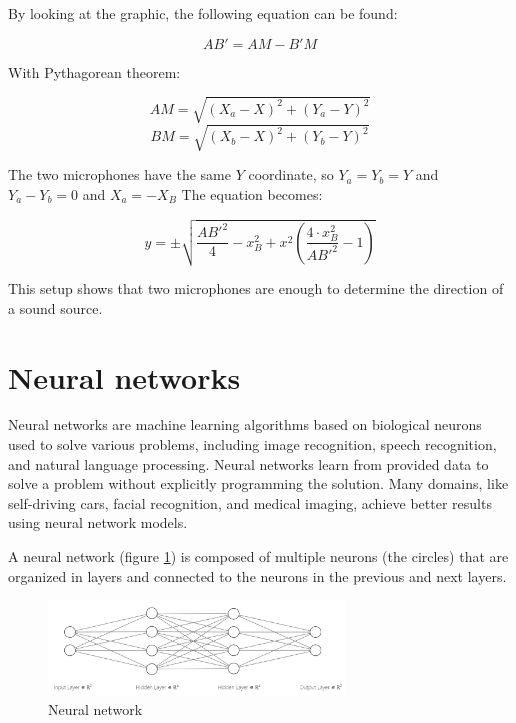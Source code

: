 By looking at the graphic, the following equation can be found:

\begin{equation}
    AB' = AM-B'M
\end{equation}

With Pythagorean theorem: 

\begin{equation}
    AM = \sqrt{(X_{a}-X)^2 + (Y_{a}-Y)^2}
\end{equation}
\begin{equation}
    BM = \sqrt{(X_{b}-X)^2 + (Y_{b}-Y)^2}
\end{equation}

The two microphones have the same $Y$ coordinate, so $Y_{a} = Y_{b} = Y$ and $Y_{a}-Y_{b} = 0$ and $X_{a} = -X_{B}$ The equation becomes:

\begin{equation}
    y = \pm\sqrt{\frac{AB'^2}{4} - x^2_{B} + x^2(\frac{4\cdot x^2_{B}}{AB'^2} - 1)}
\end{equation}

This setup shows that two microphones are enough to determine the direction of a sound source.

\section{Neural networks}

Neural networks are machine learning algorithms based on biological neurons used to solve various problems, including image recognition, speech recognition, and natural language processing. Neural networks learn from provided data to solve a problem without explicitly programming the solution. Many domains, like self-driving cars, facial recognition, and medical imaging, achieve better results using neural network models. 

A neural network (figure \ref*{fig:neural_network}) is composed of multiple neurons (the circles) that are organized in layers and connected to the neurons in the previous and next layers. 

\begin{figure}[H]
    \centering
    \includegraphics[width=0.7\textwidth]{../Images/neural_network_example.png}
    \caption{Neural network}
    \label{fig:neural_network}
\end{figure}

